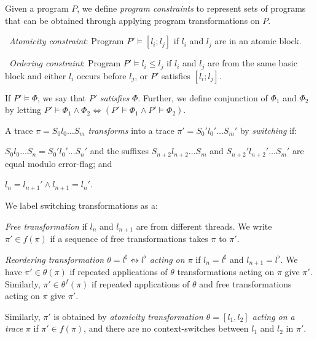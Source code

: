 \documentclass{llncs}
\newcommand\Prog{\ensuremath{\mathit{P}}}
\newcommand\ProgCons{\ensuremath{\Phi}}
\newcommand\ProgState{\ensuremath{S}}
\newcommand\trace{\pi}
\newcommand\switch[2]{#1 \ensuremath{\leftrightsquigarrow} #2}
\newcommand\reorder{\theta}
\begin{document}
Given a program $\Prog$, we define {\em program constraints} to
represent sets of programs that can be obtained through
applying program transformations on $\Prog$.
\begin{compactitem}
\item~{\em Atomicity constraint}: Program $\Prog'\!\models [l_i; l_j]$ if
  $l_i$ and $l_j$ are in an atomic block.
\item~{\em Ordering constraint}: Program $\Prog' \models l_i \leq
  l_j$ if $l_i$ and $l_j$ are from the same basic block and either
  $l_i$ occurs before $l_j$, or $\Prog'$ satisfies $[ l_i; l_j]$.
\end{compactitem}
If $\Prog' \models \ProgCons$, we say that $\Prog'$ {\em satisfies}
$\ProgCons$.
Further, we define conjunction of $\ProgCons_1$ and
$\ProgCons_2$ by letting $\Prog' \models \ProgCons_1 \wedge \ProgCons_2
\Leftrightarrow \left( \Prog' \models \ProgCons_1 \wedge \Prog' \models
\ProgCons_2 \right)$.

A trace $\trace = \ProgState_0 l_0  \ldots \ProgState_m$
{\em transforms} into a trace $\trace' = \ProgState_0' l_0'
 \ldots \ProgState_m'$ by {\em switching} if:
\begin{inparaenum}[(a)]
\item $\ProgState_0 l_0 \ldots \ProgState_n = \ProgState_0' l_0' \ldots
  \ProgState_n'$ and the suffixes
  $\ProgState_{n+2} l_{n+2} \ldots \ProgState_m$ and $\ProgState_{n+2}'
  l_{n+2}' \ldots \ProgState_m'$ are equal modulo error-flag; and
\item $l_n = l_{n+1}' \wedge l_{n+1} = l_n'$.
\end{inparaenum}
We label switching transformations as a:
\begin{compactitem}
\item {\em Free transformation} if $l_n$ and $l_{n+1}$ are from
  different threads. 
  We write $\trace'\in f(\trace)$ if a sequence of free transformations
  takes $\trace$ to $\trace'$.
\item {\em Reordering transformation $\reorder =
    \switch{l^\sharp}{l^\flat}$ acting on $\trace$} if $l_n = l^\sharp$
    and $l_{n+1} = l^\flat$.
We have $\trace' \in \reorder(\trace)$ if repeated applications of
  $\reorder$ transformations acting on $\trace$ give $\trace'$. 
  Similarly, $\trace'\in \reorder^f(\trace)$ if repeated applications of
  $\reorder$ and free transformations acting on $\trace$
  give $\trace'$.
\end{compactitem}
Similarly, $\trace'$ is obtained by {\em atomicity
transformation $\reorder = [l_1, l_2]$ acting on a trace} $\trace$
if $\trace' \in f(\trace)$, and there are no context-switches between
$l_1$ and $l_2$ in $\trace'$.
\end{document}
